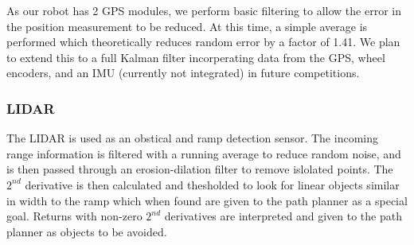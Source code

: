 As our robot has 2 GPS modules, we perform basic filtering to allow the error in the position measurement to be reduced. At this time, a simple average is performed which theoretically reduces random error by a factor of 1.41. We plan to extend this to a full Kalman filter incorperating data from the GPS, wheel encoders, and an IMU (currently not integrated) in future competitions.

\subsubsection{LIDAR}

The LIDAR is used as an obstical and ramp detection sensor. The incoming range information is filtered with a running average to reduce random noise, and is then passed through an erosion-dilation filter to remove islolated points. The $2^{nd}$ derivative is then calculated and thesholded to look for linear objects similar in width to the ramp which when found are given to the path planner as a special goal. Returns with non-zero $2^{nd}$ derivatives are interpreted and given to the path planner as objects to be avoided.